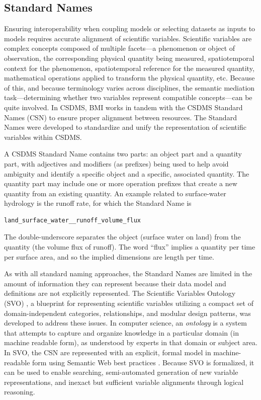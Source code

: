 \documentclass[journal abbreviation, manuscript]{copernicus}
\begin{document}
\subsection{Standard Names}

Ensuring interoperability when coupling models or selecting datasets as inputs to models requires accurate alignment of scientific variables. Scientific variables are complex concepts composed of multiple facets---a phenomenon or object of observation, the corresponding physical quantity being measured, spatiotemporal context for the phenomenon, spatiotemporal reference for the measured quantity, mathematical operations applied to transform the physical quantity, etc. Because of this, and because terminology varies across disciplines, the semantic mediation task---determining whether two variables represent compatible concepts---can be quite involved. In CSDMS, BMI works in tandem with the CSDMS Standard Names (CSN) \citep{peckham2013component} to ensure proper alignment between resources. The Standard Names were developed to standardize and unify the representation of scientific variables within CSDMS.

A CSDMS Standard Name contains two parts: an object part and a quantity part, with adjectives and modifiers (as prefixes) being used to help avoid ambiguity and identify a specific object and a specific, associated quantity. The quantity part may include one or more operation prefixes that create a new quantity from an existing quantity. An example related to surface-water hydrology is the runoff rate, for which the Standard Name is

\begin{verbatim}
land_surface_water__runoff_volume_flux
\end{verbatim}
The double-underscore separates the object (surface water on land) from the quantity (the volume flux of runoff). The word ``flux'' implies a quantity per time per surface area, and so the implied dimensions are length per time. 

As with all standard naming approaches, the Standard Names are limited in the amount of information they can represent because their data model and definitions are not explicitly represented. The Scientific Variables Ontology (SVO) \citep{stoica2018ontology, stoica2019scientific, stoica2019incorporating, stoica2020github, svoweb}, a blueprint for representing scientific variables utilizing a compact set of domain-independent categories, relationships, and modular design patterns, was developed to address these issues. In computer science, an \textit{ontology} is a system that attempts to capture and organize knowledge in a particular domain (in machine readable form), as understood by experts in that domain or subject area. In SVO, the CSN are represented with an explicit, formal model in machine-readable form using Semantic Web best practices \citep{berrueta2008best}. Because SVO is formalized, it can be used to enable searching, semi-automated generation of new variable representations, and inexact but sufficient variable alignments through logical reasoning.
\end{document}
